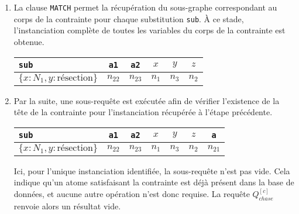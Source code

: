 \begin{example}
\begin{enumerate}[label=\emph{Etape~\arabic*},leftmargin=*]
        \item La clause \verb|MATCH| permet la récupération du sous-graphe correspondant au corps de la contrainte pour chaque substitution \verb|sub|.
              À ce stade, l'instanciation complète de toutes les variables du corps de la contrainte est obtenue.
              \begin{center}
                  \begin{tabular}{lccccc}
                      \hline
                      \verb|sub|                        & \verb|a1| & \verb|a2| & $x$     & $y$     & $z$     \\
                      \hline
                      $\{x: N_1, y: \text{résection}\}$ & $n_{22}$  & $n_{23}$  & $n_{1}$ & $n_{3}$ & $n_{2}$ \\
                      \hline
                  \end{tabular}
              \end{center}

        \item Par la suite, une sous-requête est exécutée afin de vérifier l'existence de la tête de la contrainte pour l'instanciation récupérée à l'étape précédente.
              \begin{center}
                  \begin{tabular}{lcccccc}
                      \hline
                      \verb|sub|                        & \verb|a1| & \verb|a2| & $x$     & $y$     & $z$     & \verb|a| \\
                      \hline
                      $\{x: N_1, y: \text{résection}\}$ & $n_{22}$  & $n_{23}$  & $n_{1}$ & $n_{3}$ & $n_{2}$ & $n_{21}$ \\
                      \hline
                  \end{tabular}
              \end{center}
              Ici, pour l'unique instanciation identifiée, la sous-requête n'est pas vide.
              Cela indique qu'un atome satisfaisant la contrainte est déjà présent dans la base de données, et aucune autre opération n'est donc requise.
              La requête $Q_{chase}^{[c]}$ renvoie alors un résultat vide.
    \end{enumerate}
\end{example}

